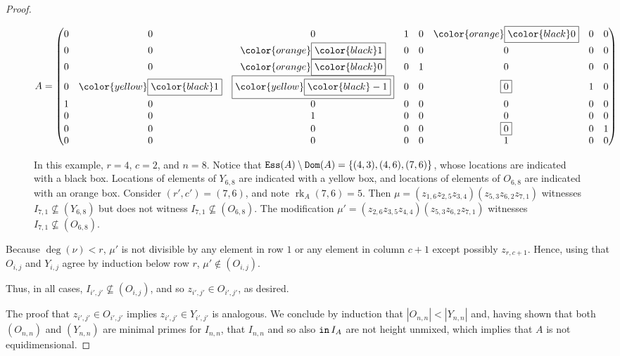 \documentclass[12 pt]{amsart}
\DeclareMathOperator{\init}{{\tt in}}
\DeclareMathOperator{\ess}{{\tt Ess}}
\DeclareMathOperator{\Dom}{{\tt Dom}}
\DeclareMathOperator{\rk}{rk}
\theoremstyle{plain}
\theoremstyle{definition}
\theoremstyle{remark}
\begin{document}
{\begin{proof}
\begin{figure}[htp]
\[
A = \begin{pmatrix}
    0 & 0 & 0 & 1 & 0 & {\color{orange}\boxed{\color{black}0}} & 0 & 0\\
    0 & 0 & {\color{orange}\boxed{\color{black}1}} & 0 & 0 & 0 & 0 & 0\\
    0 & 0 & {\color{orange}\boxed{\color{black}0}} & 0 & 1 & 0 & 0 & 0\\
    0 & {\color{yellow}\boxed{\color{black}1}} & \boxed{{\color{yellow}\boxed{\color{black}-1}}} & 0 & 0 & \boxed{0} & 1 & 0\\
    1 & 0 & 0 & 0 & 0 & 0 & 0 & 0\\
    0 & 0 & 1 & 0 & 0 & 0 & 0 & 0\\
    0 & 0 & 0 & 0 & 0 & \boxed{0} & 0 & 1\\
    0 & 0 & 0 & 0 & 0 & 1 & 0 & 0
\end{pmatrix}
\]
    \caption{In this example, $r = 4$, $c=2$, and $n=8$. Notice that $\ess(A) \setminus \Dom(A) = \{(4,3), (4,6), (7,6)\}$, whose locations are indicated with a black box.  Locations of elements of $Y_{6,8}$ are indicated with a yellow box, and locations of elements of $O_{6,8}$ are indicated with an orange box. Consider $(r',c') = (7,6)$, and note $\rk_A(7,6) = 5$.  Then $\mu = (z_{1,6}z_{2,5}z_{3,4})(z_{5,3}z_{6,2}z_{7,1})$ witnesses $I_{7,1} \not\subseteq (Y_{6,8})$ but does not witness $I_{7,1} \not\subseteq (O_{6,8})$.  The modification $\mu' = (z_{2,6}z_{3,5}z_{4,4})(z_{5,3}z_{6,2}z_{7,1})$ witnesses $I_{7,1} \not\subseteq (O_{6,8})$.}
    \label{fig:shiftsoutheast}
\end{figure}

Because $\deg(\nu)<r$, $\mu'$ is not divisible by any element in row $1$ or any element in column $c+1$ except possibly $z_{r,c+1}$.  Hence, using that $O_{i,j}$ and $Y_{i,j}$ agree by induction below row $r$, $\mu' \notin (O_{i,j})$.  

Thus, in all cases, $I_{i',j'} \not\subseteq (O_{i,j})$, and so $z_{i',j'} \in O_{i',j'}$, as desired. 

The proof that $z_{i',j'} \in O_{i',j'}$ implies $z_{i',j'} \in Y_{i',j'}$ is analogous. We conclude by induction that $|O_{n,n}|<|Y_{n,n}|$ and, having shown that both $(O_{n,n})$ and $(Y_{n,n})$ are minimal primes for $I_{n,n}$, that $I_{n,n}$ and so also $\init I_A$ are not height unmixed, which implies that $A$ is not equidimensional. \end{proof}




















}
\end{document}
